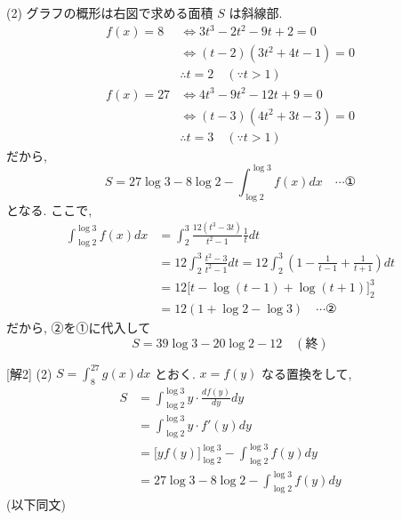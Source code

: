\documentclass[../main.tex]{subfiles}
\begin{document}
(2) グラフの概形は右図で求める面積 $S$ は斜線部.
\begin{align*}
  f(x) = 8 &\iff 3t^3 - 2t^2 - 9t + 2 = 0 \\
  &\iff (t - 2)(3t^2 + 4t - 1) = 0 \\
  &\therefore t = 2 \quad (\because t > 1) \\
  f(x) = 27 &\iff 4t^3 - 9t^2 - 12t + 9 = 0 \\
  &\iff (t - 3)(4t^2 + 3t - 3) = 0 \\
  &\therefore t = 3 \quad (\because t > 1)
\end{align*}
だから,
\[ S = 27 \log 3 - 8 \log 2 - \int_{\log 2}^{\log 3} f(x) dx \quad \cdots \text{①} \]
となる. ここで,
\begin{align*}
  \int_{\log 2}^{\log 3} f(x) dx &= \int_2^3 \frac{12(t^3 - 3t)}{t^2 - 1} \frac{1}{t} dt \\
  &= 12 \int_2^3 \frac{t^2 - 3}{t^2 - 1} dt = 12 \int_2^3 \left( 1 - \frac{1}{t - 1} + \frac{1}{t + 1} \right) dt \\
  &= 12 \Big[ t - \log(t-1) + \log(t+1) \Big]_2^3 \\
  &= 12(1 + \log 2 - \log 3) \quad \cdots \text{②}
\end{align*}
だから, ②を①に代入して
\[ S = 39 \log 3 - 20 \log 2 - 12 \quad (\text{終}) \]

[解2]
(2) $S = \int_8^{27} g(x) dx$ とおく. $x = f(y)$ なる置換をして,
\begin{align*}
  S &= \int_{\log 2}^{\log 3} y \cdot \frac{df(y)}{dy} dy \\
  &= \int_{\log 2}^{\log 3} y \cdot f'(y) dy \\
  &= \Big[ y f(y) \Big]_{\log 2}^{\log 3} - \int_{\log 2}^{\log 3} f(y) dy \\
  &= 27 \log 3 - 8 \log 2 - \int_{\log 2}^{\log 3} f(y) dy
\end{align*}
(以下同文)

\begin{center}
\end{center}
\end{document}
